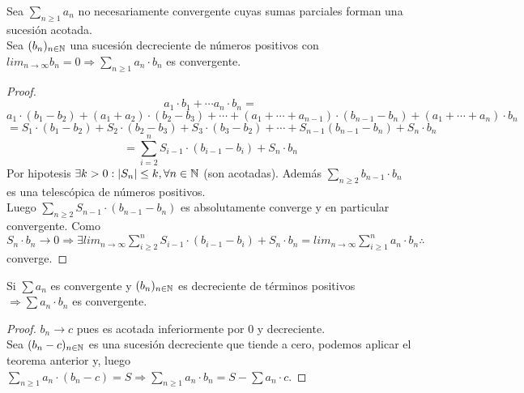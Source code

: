 \begin{theorem}
  Sea $\sum_{n \geq 1} a_n$ no necesariamente convergente cuyas sumas parciales forman una sucesión acotada. \\
  Sea $(b_n)_{n \in \mathbb{N}}$ una sucesión decreciente de números positivos con $lim_{n \to \infty} b_n = 0 \Rightarrow \sum_{n \geq 1} a_n \cdot b_n$ es convergente.

  \begin{proof}
    \begin{equation}
      a_1 \cdot b_1 + \cdots a_n \cdot b_n =  
    \end{equation}
    \begin{equation}
      a_1 \cdot (b_1 - b_2) + (a_1 + a_2) \cdot (b_2 - b_3) + \cdots + (a_1 + \cdots + a_{n-1}) \cdot (b_{n-1} - b_n) + (a_1 + \cdots + a_n) \cdot b_n
    \end{equation}
    \begin{equation}
      = S_1 \cdot (b_1 - b_2) + S_2 \cdot (b_2 - b_3) + S_3 \cdot (b_3 - b_2) + \cdots + S_{n-1} (b_{n-1} - b_n) + S_n \cdot b_n 
    \end{equation}
    \begin{equation}
      = \sum_{i = 2}^n S_{i-1} \cdot (b_{i-1} - b_i) + S_n \cdot b_n
    \end{equation}
    Por hipotesis $\exists k > 0 : |S_n| \leq k, \forall n \in \mathbb{N}$ (son acotadas). Además $\sum_{n \geq 2} b_{n-1} \cdot b_n$ es una telescópica de números positivos. \\
    Luego $\sum_{n \geq 2} S_{n-1} \cdot (b_{n-1} - b_n)$ es absolutamente converge y en particular convergente.
    Como $S_n \cdot b_n \to 0 \Rightarrow \exists lim_{n \to \infty} \sum_{i \geq 2}^n S_{i-1} \cdot (b_{i-1} - b_i) + S_n \cdot b_n = lim_{n \to \infty} \sum_{i \geq 1}^n a_n \cdot b_n \therefore$ converge.
  \end{proof}
\end{theorem}

\begin{corollary}[Abel]
  Si $\sum a_n$ es convergente y $(b_n)_{n \in \mathbb{N}}$ es decreciente de términos positivos $\Rightarrow \sum a_n \cdot b_n$ es convergente.
  \begin{proof}
    $b_n \to c$ pues es acotada inferiormente por $0$ y decreciente. \\
    Sea $(b_n - c)_{n \in \mathbb{N}}$ es una sucesión decreciente que tiende a cero, podemos aplicar el teorema anterior y, luego $\sum_{n \geq 1} a_n \cdot (b_n - c) = S \Rightarrow \sum_{n \geq 1} a_n \cdot b_n = S - \sum a_n \cdot c$.
  \end{proof}
\end{corollary}

